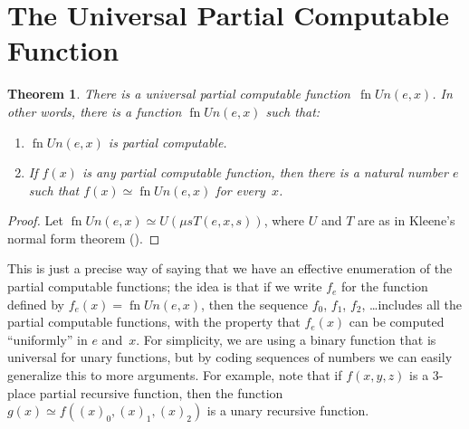 \documentclass[10pt,a4paper]{article}
\makeatletter
\theoremstyle{plain}
\newtheorem{thm}{Theorem}[section]
\theoremstyle{definition}
\theoremstyle{remark}
\newenvironment{explain}{}{}
\newcommand*{\olfileid}[3]{}
\newcommand*{\olsection}[1]{\section*{#1}}
\newcommand*{\ollabel}[1]{\label{#1}}
\newcommand{\olref}{\@ifnextchar[{\olref@i}{\olref@final}}
\def\olref@i[#1]{\@ifnextchar[{\olref@ii}{\olref@final}}
\def\olref@ii[#1]{\@ifnextchar[{\olref@iii}{\olref@final}}
\def\olref@iii[#1]{\olref@final}
\def\olref@final#1{\ref{#1}}
\providecommand{\umin}{\mu}
\providecommand{\fn}{\operatorname{fn}}
\makeatother
\begin{document}
\olfileid{cmp}{thy}{uni}
\olsection{The Universal Partial Computable Function}

\begin{thm}
\ollabel{thm:univ-comp}
There is a universal partial computable function~$\fn{Un}(e,x)$. In other
words, there is a function $\fn{Un}(e,x)$ such that:
\begin{enumerate}
\item $\fn{Un}(e,x)$ is partial computable.
\item If $f(x)$ is any partial computable function, then there is a
natural number $e$ such that $f(x) \simeq \fn{Un}(e,x)$ for every~$x$.
\end{enumerate}
\end{thm}

\begin{proof}
Let $\fn{Un}(e,x) \simeq U(\umin{s}{T(e,x,s)})$, where $U$ and $T$ are
as in Kleene's normal form theorem (\olref[nfm]{thm:normal-form}).
\end{proof}

\begin{explain}
This is just a precise way of saying that we have an effective
enumeration of the partial computable functions; the idea is that if
we write $f_e$ for the function defined by $f_e(x) = \fn{Un}(e,x)$,
then the sequence $f_0$, $f_1$, $f_2$, \dots includes all the partial
computable functions, with the property that $f_e(x)$ can be computed
``uniformly'' in $e$ and~$x$. For simplicity, we are using a binary
function that is universal for unary functions, but by coding
sequences of numbers we can easily generalize this to more arguments.
For example, note that if $f(x,y,z)$ is a $3$-place partial recursive
function, then the function $g(x) \simeq f((x)_0, (x)_1, (x)_2)$ is a
unary recursive function.
\end{explain}
\end{document}
